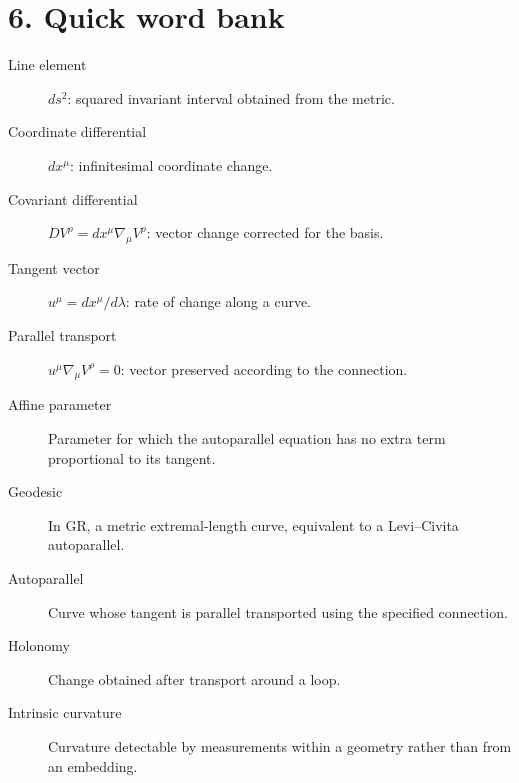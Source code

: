 \documentclass[10pt,a4paper]{article}
\begin{document}
\section*{6. Quick word bank}
\begin{description}
\item[Line element] $ds^2$: squared invariant interval obtained from the metric.
\item[Coordinate differential] $dx^\mu$: infinitesimal coordinate change.
\item[Covariant differential] $DV^\rho=dx^\mu\nabla_\mu V^\rho$: vector change corrected for the basis.
\item[Tangent vector] $u^\mu=dx^\mu/d\lambda$: rate of change along a curve.
\item[Parallel transport] $u^\mu\nabla_\mu V^\rho=0$: vector preserved according to the connection.
\item[Affine parameter] Parameter for which the autoparallel equation has no extra term proportional to its tangent.
\item[Geodesic] In GR, a metric extremal-length curve, equivalent to a Levi--Civita autoparallel.
\item[Autoparallel] Curve whose tangent is parallel transported using the specified connection.
\item[Holonomy] Change obtained after transport around a loop.
\item[Intrinsic curvature] Curvature detectable by measurements within a geometry rather than from an embedding.
\end{description}
\end{document}

